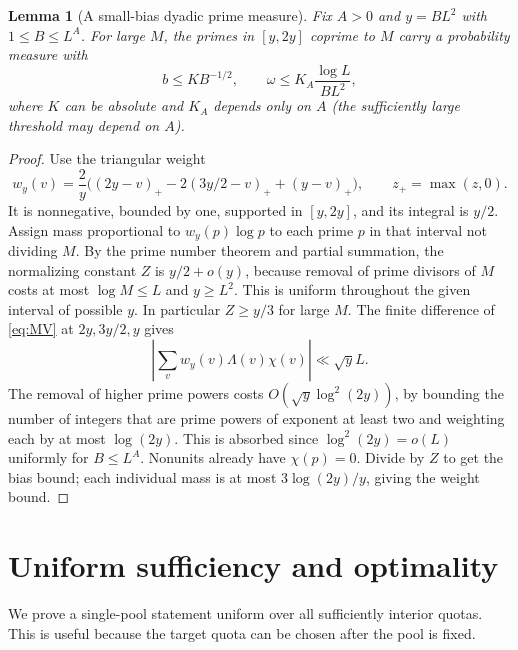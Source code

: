 \documentclass[11pt]{article}
\newtheorem{lemma}[theorem]{Lemma}
\theoremstyle{definition}\newtheorem{remark}[theorem]{Remark}
\begin{document}
\begin{lemma}[A small-bias dyadic prime measure]\label{lem:prime}
Fix $A>0$ and $y=B L^2$ with $1\le B\le L^A$. For large $M$, the primes in $[y,2y]$ coprime to $M$ carry a probability measure with
\begin{equation}\label{eq:primebounds}
 b\le K B^{-1/2},\qquad \omega\le K_A\frac{\log L}{B L^2},
\end{equation}
where $K$ can be absolute and $K_A$ depends only on $A$ (the sufficiently large threshold may depend on $A$).
\end{lemma}
\begin{proof}
Use the triangular weight
\[
 w_y(v)=\frac{2}{y}\big((2y-v)_+-2(3y/2-v)_++(y-v)_+\big),
 \qquad z_+=\max(z,0).
\]
It is nonnegative, bounded by one, supported in $[y,2y]$, and its integral is $y/2$. Assign mass proportional to $w_y(p)\log p$ to each prime $p$ in that interval not dividing $M$. By the prime number theorem and partial summation, the normalizing constant $Z$ is $y/2+o(y)$, because removal of prime divisors of $M$ costs at most $\log M\le L$ and $y\ge L^2$. This is uniform throughout the given interval of possible $y$. In particular $Z\ge y/3$ for large $M$. The finite difference of \eqref{eq:MV} at $2y,3y/2,y$ gives
\[
 \left|\sum_v w_y(v)\Lambda(v)\chi(v)\right|\ll \sqrt y L.
\]
The removal of higher prime powers costs $O(\sqrt y\log^2(2y))$, by bounding the number of integers that are prime powers of exponent at least two and weighting each by at most $\log(2y)$. This is absorbed since $\log^2(2y)=o(L)$ uniformly for $B\le L^A$. Nonunits already have $\chi(p)=0$. Divide by $Z$ to get the bias bound; each individual mass is at most $3\log(2y)/y$, giving the weight bound.
\end{proof}

\section{Uniform sufficiency and optimality}\label{sec:asymptotic}
We prove a single-pool statement uniform over all sufficiently interior quotas. This is useful because the target quota can be chosen after the pool is fixed.
\end{document}
